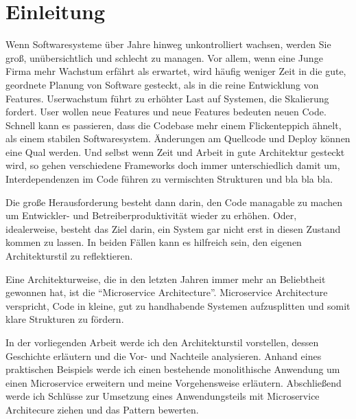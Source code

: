 \chapter{Einleitung}
Wenn Softwaresysteme über Jahre hinweg unkontrolliert wachsen, werden Sie groß, unübersichtlich und schlecht zu managen. Vor allem, wenn eine Junge Firma mehr Wachstum erfährt als erwartet, wird häufig weniger Zeit in die gute, geordnete Planung von Software gesteckt, als in die reine Entwicklung von Features. Userwachstum führt zu erhöhter Last auf Systemen, die Skalierung fordert. User wollen neue Features und neue Features bedeuten neuen Code. Schnell kann es passieren, dass die Codebase mehr einem Flickenteppich ähnelt, als einem stabilen Softwaresystem. Änderungen am Quellcode und Deploy können eine Qual werden. Und selbst wenn Zeit und Arbeit in gute Architektur gesteckt wird, so gehen verschiedene Frameworks doch immer unterschiedlich damit um, Interdependenzen im Code führen zu vermischten Strukturen und bla bla bla.

Die große Herausforderung besteht dann darin, den Code managable zu machen um Entwickler- und Betreiberproduktivität wieder zu erhöhen. Oder, idealerweise, besteht das Ziel darin, ein System gar nicht erst in diesen Zustand kommen zu lassen. In beiden Fällen kann es hilfreich sein, den eigenen Architekturstil zu reflektieren.

Eine Architekturweise, die in den letzten Jahren immer mehr an Beliebtheit gewonnen hat, ist die ``Microservice Architecture''. Microservice Architecture verspricht, Code in kleine, gut zu handhabende Systemen aufzusplitten und somit klare Strukturen zu fördern. 

In der vorliegenden Arbeit werde ich den Architekturstil vorstellen, dessen Geschichte erläutern und die Vor- und Nachteile analysieren. Anhand eines praktischen Beispiels werde ich einen bestehende monolithische Anwendung um einen Microservice erweitern und meine Vorgehensweise erläutern. Abschließend werde ich Schlüsse zur Umsetzung eines Anwendungsteils mit Microservice Architecure ziehen und das Pattern bewerten.